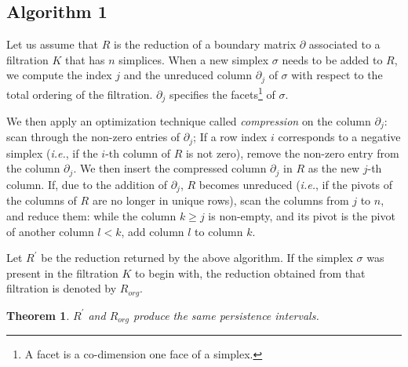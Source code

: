 \documentclass[11pt]{article}
\newtheorem{theorem}{Theorem}[section]
\begin{document}
\subsection{Algorithm 1}

Let us assume that $R$ is the reduction of a boundary matrix $\partial$ associated to a filtration 
$K$ that has $n$ simplices.  When a new simplex $\sigma$ needs to be added to $R$, we compute the 
index $j$ and the unreduced column $\partial_j$ of $\sigma$ with respect to the total ordering of 
the filtration.  $\partial_j$ specifies the facets\footnote{A facet is a co-dimension one face of a 
simplex.} of $\sigma$.

We then apply an optimization technique called \emph{compression} \cite{kerber-18} on the column 
$\partial_j$: scan through the non-zero entries of $\partial_j$; If a row index $i$ corresponds to 
a negative simplex (\emph{i.e.}, if the $i$-th column of $R$ is not zero), remove the non-zero entry
from the column $\partial_j$.  We then insert the compressed column $\partial_j$ in $R$ as the new 
$j$-th column.  If, due to the addition of $\partial_j$, $R$ becomes unreduced (\emph{i.e.}, if the 
pivots of the columns of $R$ are no longer in unique rows), scan the columns from $j$ to $n$, and 
reduce them: while the column $k \geq j$ is non-empty, and its pivot is the pivot of another column 
$l < k$, add column $l$ to column $k$.


Let $R^\prime$ be the reduction returned by the above algorithm.  If the simplex $\sigma$ was 
present in the filtration $K$ to begin with, the reduction obtained from that filtration is denoted 
by $R_{org}$.


\begin{theorem}
	$R^\prime$ and $R_{org}$ produce the same persistence intervals.
\end{theorem}
\end{document}
